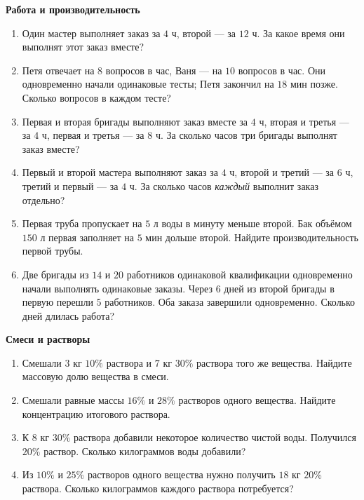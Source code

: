 \documentclass[a4paper,12pt]{article}
\newcommand{\key}[1]{\textbf{\color{darkaccent}#1}}
\begin{document}
\key{Работа и производительность}
\begin{enumerate}[label=\textbf{\arabic*.},itemsep=2.7mm]
\item Один мастер выполняет заказ за $4$ ч, второй --- за $12$ ч. За какое время они выполнят этот заказ вместе?
\item Петя отвечает на $8$ вопросов в час, Ваня --- на $10$ вопросов в час. Они одновременно начали одинаковые тесты; Петя закончил на $18$ мин позже. Сколько вопросов в каждом тесте?
\item Первая и вторая бригады выполняют заказ вместе за $4$ ч, вторая и третья --- за $4$ ч, первая и третья --- за $8$ ч. За сколько часов три бригады выполнят заказ вместе?
\item Первый и второй мастера выполняют заказ за $4$ ч, второй и третий --- за $6$ ч, третий и первый --- за $4$ ч. За сколько часов \emph{каждый} выполнит заказ отдельно?
\item Первая труба пропускает на $5$ л воды в минуту меньше второй. Бак объёмом $150$ л первая заполняет на $5$ мин дольше второй. Найдите производительность первой трубы.
\item Две бригады из $14$ и $20$ работников одинаковой квалификации одновременно начали выполнять одинаковые заказы. Через $6$ дней из второй бригады в первую перешли $5$ работников. Оба заказа завершили одновременно. Сколько дней длилась работа?
\end{enumerate}

\vspace{2mm}\key{Смеси и растворы}
\begin{enumerate}[label=\textbf{\arabic*.},start=7,itemsep=2.7mm]
\item Смешали $3$ кг $10\%$ раствора и $7$ кг $30\%$ раствора того же вещества. Найдите массовую долю вещества в смеси.
\item Смешали равные массы $16\%$ и $28\%$ растворов одного вещества. Найдите концентрацию итогового раствора.
\item К $8$ кг $30\%$ раствора добавили некоторое количество чистой воды. Получился $20\%$ раствор. Сколько килограммов воды добавили?
\item Из $10\%$ и $25\%$ растворов одного вещества нужно получить $18$ кг $20\%$ раствора. Сколько килограммов каждого раствора потребуется?
\end{enumerate}
\end{document}
